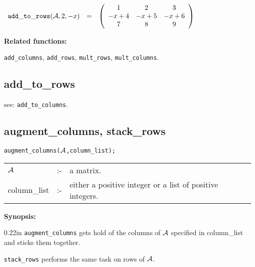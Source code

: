 \vspace*{0.1in}

\begin{flushleft}  
\hspace*{0.175in}
\begin{math}
\begin{array}{ccc}
{\tt add\_to\_rows}({\cal A},2,-x) & = & 
\left( \begin{array}{ccc} 1 & 2 & 3 \\ -x+4 & -x+5 & -x+6 \\ 7 & 8 & 9 
\end{array} \right)  
\end{array}
\end{math}
\end{flushleft}

{\bf Related functions:}

\hspace*{0.175in} 
{\tt add\_columns}, {\tt add\_rows}, {\tt mult\_rows}, 
{\tt mult\_columns}.


\subsection{add\_to\_rows}

\hspace*{0.175in} see: {\tt add\_to\_columns}.


\subsection{augment\_columns, stack\_rows}


\hspace*{0.175in} {\tt augment\_columns(${\cal A}$,column\_list);}

\hspace*{0.1in}
\begin{tabular}{l l l}
${\cal A}$  &:-& a matrix. \\
column\_list &:-&  either a positive integer or a list of positive 
                   integers. 
\end{tabular}

{\bf Synopsis:} %

\begin{addtolength}{\leftskip}{0.22in}
{\tt augment\_columns} gets hold of the columns of ${\cal A}$ specified 
in column\_list and sticks them together. 

{\tt stack\_rows} performs the same task on rows of 
                ${\cal A}$.

\end{addtolength}

